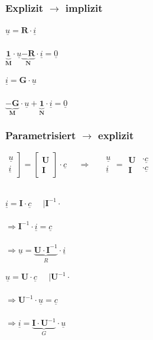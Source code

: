 \documentclass[a4paper,twocolumn,10pt]{article}
\begin{document}
\subsubsection*{Explizit $\rightarrow$ implizit}
\begin{minipage}[b]{0.23\textwidth}
$\underline{u}=\textbf{R}\cdot \underline{i}$\\\\
$\underbrace{\textbf{1}}_{\textbf{M}}\cdot \underline{u}\underbrace{-\textbf{R}}_{\textbf{N}}\cdot \underline{i}=\underline{0}$
\end{minipage}
\hfill
\begin{minipage}[b]{0.23\textwidth}
$\underline{i}=\textbf{G}\cdot \underline{u}$\\\\
$\underbrace{-\textbf{G}}_{\textbf{M}}\cdot \underline{u}+\underbrace{\textbf{1}}_{\textbf{N}}\cdot \underline{i}=\underline{0}$
\end{minipage}

\subsubsection*{Parametrisiert $\rightarrow$ explizit}
$\left.\begin{matrix}\underline{u}\\\underline{i}\end{matrix}\right]=\begin{bmatrix}\textbf{U} \\ \textbf{I}\end{bmatrix}\cdot \underline{c}\;\;\;\;\;\Rightarrow\;\;\;\;\; \begin{matrix}\underline{u}\\\underline{i}\end{matrix}=\begin{matrix}\textbf{U}\\ \textbf{I}\end{matrix} \begin{matrix}\cdot\underline{c}\\ \cdot\underline{c}\end{matrix}$\\\\
\begin{minipage}[b]{0.23\textwidth}
$\underline{i}=\textbf{I}\cdot \underline{c}\;\;\;\;\;|\textbf{I}^{-1}\cdot$\\\\
$\Rightarrow \textbf{I}^{-1}\cdot \underline{i}=\underline{c}$\\\\
$\Rightarrow \underline{u}=\underbrace{\textbf{U}\cdot \textbf{I}^{-1}}_{R}\cdot \underline{i}$
\end{minipage}
\hfill
\begin{minipage}[b]{0.23\textwidth}
$\underline{u}=\textbf{U}\cdot \underline{c}\;\;\;\;\;|\textbf{U}^{-1}\cdot$\\\\
$\Rightarrow \textbf{U}^{-1}\cdot \underline{u}=\underline{c}$\\\\
$\Rightarrow \underline{i}=\underbrace{\textbf{I}\cdot \textbf{U}^{-1}}_{G}\cdot \underline{u}$
\end{minipage}
\end{document}
